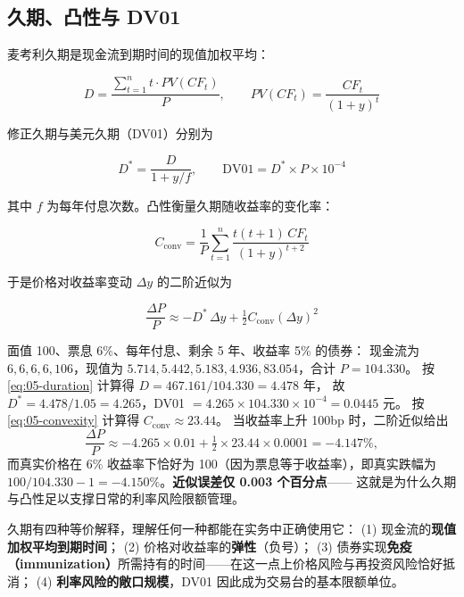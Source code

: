 \subsection{久期、凸性与 DV01}

麦考利久期是现金流到期时间的现值加权平均：

\begin{equation}
  D = \frac{\sum_{t=1}^{n} t\cdot PV(CF_t)}{P},
  \qquad PV(CF_t) = \frac{CF_t}{(1+y)^{t}}
  \label{eq:05-duration}
\end{equation}

修正久期与美元久期（DV01）分别为

\begin{equation}
  D^{*} = \frac{D}{1+y/f}, \qquad \text{DV01} = D^{*}\times P\times 10^{-4}
  \label{eq:05-modified}
\end{equation}

其中 $f$ 为每年付息次数。凸性衡量久期随收益率的变化率：

\begin{equation}
  C_{\text{conv}} = \frac{1}{P}\sum_{t=1}^{n}\frac{t(t+1)\,CF_t}{(1+y)^{t+2}}
  \label{eq:05-convexity}
\end{equation}

于是价格对收益率变动 $\Delta y$ 的二阶近似为

\begin{equation}
  \frac{\Delta P}{P} \approx -D^{*}\,\Delta y + \tfrac12 C_{\text{conv}}\left(\Delta y\right)^{2}
  \label{eq:05-conv-adjust}
\end{equation}

\begin{example}[久期与凸性的一次完整计算]\label{ex:05-dur-conv}
面值 100、票息 6\%、每年付息、剩余 5 年、收益率 5\% 的债券：
现金流为 $6,6,6,6,106$，现值为 $5.714,5.442,5.183,4.936,83.054$，合计 $P = 104.330$。
按 \cref{eq:05-duration} 计算得 $D = 467.161/104.330 = 4.478$ 年，
故 $D^{*} = 4.478/1.05 = 4.265$，DV01 $= 4.265\times104.330\times10^{-4} = 0.0445$ 元。
按 \cref{eq:05-convexity} 计算得 $C_{\text{conv}} \approx 23.44$。
当收益率上升 100bp 时，二阶近似给出
\[
  \frac{\Delta P}{P}\approx -4.265\times0.01+\tfrac12\times23.44\times0.0001 = -4.147\%,
\]
而真实价格在 6\% 收益率下恰好为 100（因为票息等于收益率），即真实跌幅为
$100/104.330-1 = -4.150\%$。\textbf{近似误差仅 0.003 个百分点}——
这就是为什么久期与凸性足以支撑日常的利率风险限额管理。
\end{example}

\begin{keybox}
久期有四种等价解释，理解任何一种都能在实务中正确使用它：
(1) 现金流的\textbf{现值加权平均到期时间}；
(2) 价格对收益率的\textbf{弹性}（负号）；
(3) 债券实现\textbf{免疫（immunization）}所需持有的时间——在这一点上价格风险与再投资风险恰好抵消；
(4) \textbf{利率风险的敞口规模}，DV01 因此成为交易台的基本限额单位。
\end{keybox}

